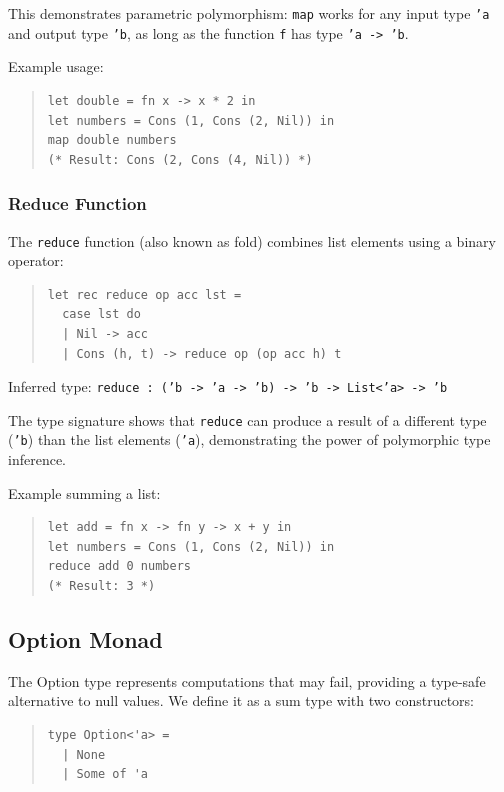 \documentclass[conference,onecolumn]{IEEEtran}
\begin{document}
This demonstrates parametric polymorphism: \texttt{map} works for any input type \texttt{'a} and output type \texttt{'b}, as long as the function \texttt{f} has type \texttt{'a -> 'b}.

Example usage:
\begin{quote}
\small
\begin{verbatim}
let double = fn x -> x * 2 in
let numbers = Cons (1, Cons (2, Nil)) in
map double numbers
(* Result: Cons (2, Cons (4, Nil)) *)
\end{verbatim}
\end{quote}

\subsubsection{Reduce Function}

The \texttt{reduce} function (also known as fold) combines list elements using a binary operator:

\begin{quote}
\small
\begin{verbatim}
let rec reduce op acc lst =
  case lst do
  | Nil -> acc
  | Cons (h, t) -> reduce op (op acc h) t
\end{verbatim}
\end{quote}

Inferred type: \texttt{reduce : ('b -> 'a -> 'b) -> 'b -> List<'a> -> 'b}

The type signature shows that \texttt{reduce} can produce a result of a different type (\texttt{'b}) than the list elements (\texttt{'a}), demonstrating the power of polymorphic type inference.

Example summing a list:
\begin{quote}
\small
\begin{verbatim}
let add = fn x -> fn y -> x + y in
let numbers = Cons (1, Cons (2, Nil)) in
reduce add 0 numbers
(* Result: 3 *)
\end{verbatim}
\end{quote}

\subsection{Option Monad}

The Option type represents computations that may fail, providing a type-safe alternative to null values. We define it as a sum type with two constructors:

\begin{quote}
\small
\begin{verbatim}
type Option<'a> = 
  | None 
  | Some of 'a
\end{verbatim}
\end{quote}
\end{document}
